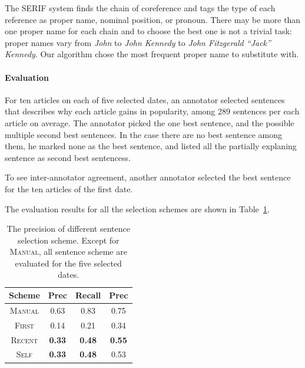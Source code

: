 \documentclass[11pt]{article}
\begin{document}
The SERIF system finds the chain of coreference and tags the type of each reference
as proper name, nominal position, or pronoun.
There may be more than one proper name for each chain and to choose the best one
is not a trivial task: proper names vary from \textit{John} to \textit{John Kennedy} to \textit{John Fitzgerald ``Jack'' Kennedy}.
Our algorithm chose the most frequent proper name to substitute with.

\paragraph {Evaluation}
For ten articles on each of five selected dates, an annotator selected sentences that describes why each article gains in popularity,
among 289 sentences per each article on average.
The annotator picked the one best sentence, and the possible multiple second best sentences.
In the case there are no best sentence among them, he marked none as the best sentence,
and listed all the partially explaning sentence as second best sentencess.

To see inter-annotator agreement, another annotator selected the best sentence for the ten articles of the first date.

The evaluation results for all the selection schemes are shown in Table~\ref{tab:sentence-selection-results}.

\begin{table}
\centering
\begin{tabular}{cccc}
Scheme & Prec\footnotemark[1] & Recall\footnotemark[1] & Prec\footnotemark[2] \\
\hline
\textsc{Manual}\footnotemark[3] & \small 0.63 & \small 0.83 & \small 0.75 \\
\hline
\textsc{First} & \small 0.14 & \small 0.21 & \small 0.34 \\
\textsc{Recent} & \small \textbf{0.33} & \small \textbf{0.48} & \small \textbf{0.55} \\
\textsc{Self} & \small \textbf{0.33} & \small \textbf{0.48} & \small 0.53 \\
\end{tabular}
\caption{The precision of different sentence selection scheme. Except for \textsc{Manual},
all sentence scheme are evaluated for the five selected dates.}
\label{tab:sentence-selection-results}
\end{table}
\end{document}
